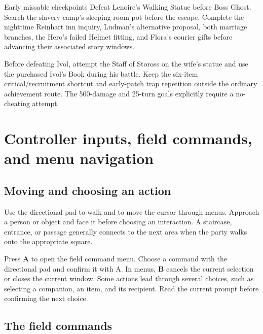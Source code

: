 \begin{achievementsetup}{Early missable checkpoints}
Defeat Lenoire's Walking Statue before Boss Ghost. Search the slavery
camp's sleeping-room pot before the escape. Complete the nighttime
Reinhart inn inquiry, Ludman's alternative proposal, both marriage
branches, the Hero's failed Helmet fitting, and Flora's courier gifts
before advancing their associated story windows.

Before defeating Ivol, attempt the Staff of Stoross on the wife's statue
and use the purchased Ivol's Book during his battle. Keep the six-item
critical/recruitment shortcut and early-patch trap repetition outside
the ordinary achievement route. The 500-damage and 25-turn goals
explicitly require a no-cheating attempt.
\end{achievementsetup}

\section{Controller inputs, field commands, and menu navigation}

\subsection*{Moving and choosing an action}

Use the directional pad to walk and to move the cursor through menus.
Approach a person or object and face it before choosing an interaction.
A staircase, entrance, or passage generally connects to the next area when
the party walks onto the appropriate square.

Press \textbf{A} to open the field command menu. Choose a command with the
directional pad and confirm it with A. In menus, \textbf{B} cancels the
current selection or closes the current window. Some actions lead through
several choices, such as selecting a companion, an item, and its recipient.
Read the current prompt before confirming the next choice.

\subsection*{The field commands}

